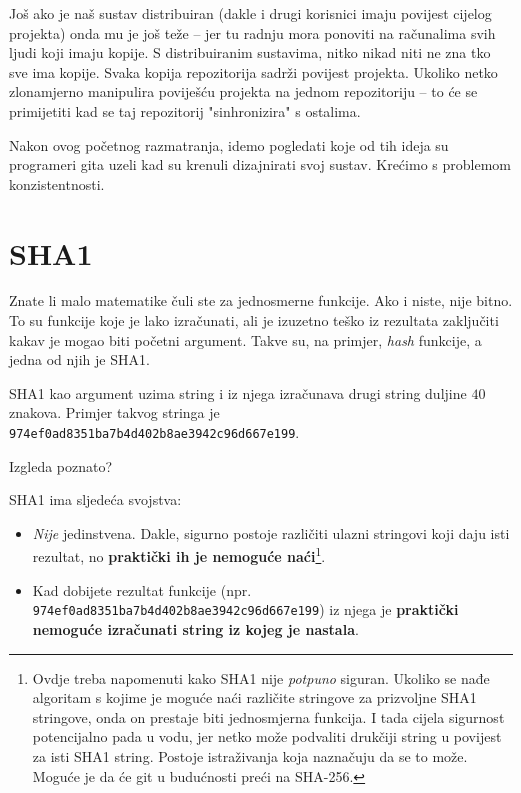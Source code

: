 Još ako je naš sustav distribuiran (dakle i drugi korisnici imaju povijest cijelog projekta) onda mu je još teže -- jer tu radnju mora ponoviti na računalima svih ljudi koji imaju kopije.
S distribuiranim sustavima, nitko nikad niti ne zna tko sve ima kopije.
Svaka kopija repozitorija sadrži povijest projekta.
Ukoliko netko zlonamjerno manipulira poviješću projekta na jednom repozitoriju -- to će se primijetiti kad se taj repozitorij "sinhronizira" s ostalima.

Nakon ovog početnog razmatranja, idemo pogledati koje od tih ideja su programeri gita uzeli kad su krenuli dizajnirati svoj sustav.
Krećimo s problemom konzistentnosti.

\section*{SHA1}

Znate li malo matematike čuli ste za jednosmerne funkcije.
Ako i niste, nije bitno. 
To su funkcije koje je lako izračunati, ali je izuzetno teško iz rezultata zaključiti kakav je mogao biti početni argument.
Takve su, na primjer, \emph{hash} funkcije, a jedna od njih je SHA1.

SHA1 kao argument uzima string i iz njega izračunava drugi string duljine $40$ znakova.
Primjer takvog stringa je \verb+974ef0ad8351ba7b4d402b8ae3942c96d667e199+.

Izgleda poznato?

SHA1 ima sljedeća svojstva:

\begin{itemize}
	\item \emph{Nije} jedinstvena. Dakle, sigurno postoje različiti ulazni stringovi koji daju isti rezultat, no \textbf{praktički ih je nemoguće naći}\footnote{Ovdje treba napomenuti kako SHA1 nije \emph{potpuno} siguran. Ukoliko se nađe algoritam s kojime je moguće naći različite stringove za prizvoljne SHA1 stringove, onda on prestaje biti jednosmjerna funkcija. I tada cijela sigurnost potencijalno pada u vodu, jer netko može podvaliti drukčiji string u povijest za isti SHA1 string. Postoje istraživanja koja naznačuju da se to može. Moguće je da će git u budućnosti preći na SHA-256.}. 
	\item Kad dobijete rezultat funkcije (npr. \verb+974ef0ad8351ba7b4d402b8ae3942c96d667e199+) iz njega je \textbf{praktički nemoguće izračunati string iz kojeg je nastala}.
\end{itemize}

